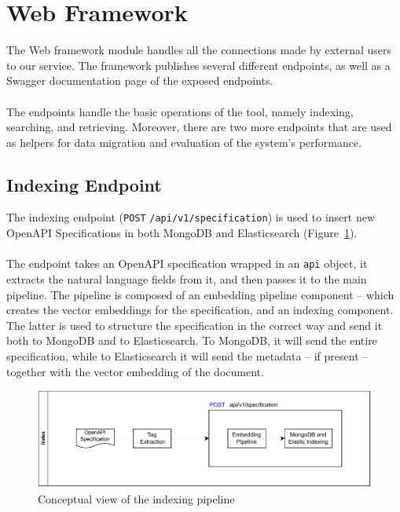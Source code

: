 \section{Web Framework}\label{sec:web-framework-1}
The Web framework module handles all the connections made by external users to our service.
The framework publishes several different endpoints, as well as a Swagger documentation page of the exposed endpoints. \\ \\
The endpoints handle the basic operations of the tool, namely indexing, searching, and retrieving.
Moreover, there are two more endpoints that are used as helpers for data migration and evaluation of the system's performance.

\subsection{Indexing Endpoint}\label{subsec:indexing-endpoint-1}
The indexing endpoint (\verb|POST| \verb|/api/v1/specification|) is used to insert new OpenAPI Specifications in both MongoDB and Elasticsearch (Figure~\ref{fig:flow-index}). \\ \\
The endpoint takes an OpenAPI specification wrapped in an \verb|api| object, it extracts the natural language fields from it, and then passes it to the main pipeline.
The pipeline is composed of an embedding pipeline component -- which creates the vector embeddings for the specification, and an indexing component.
The latter is used to structure the specification in the correct way and send it both to MongoDB and to Elasticsearch.
To MongoDB, it will send the entire specification, while to Elasticsearch it will send the metadata -- if present -- together with the vector embedding of the document.

\begin{figure}[!h]
    \begin{center}
        \includegraphics[width=0.8\linewidth]{assets/pdf/architecture/flow-index}
    \end{center}

    \caption{Conceptual view of the indexing pipeline}
    \label{fig:flow-index}
\end{figure}

